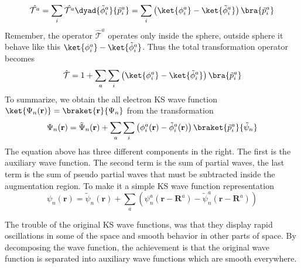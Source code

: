 \begin{equation}
\hat{\mathcal{T}^a} = \sum_i \hat{\mathcal{T}^a} \dyad{\tilde{\phi}_i^a}{\tilde{p}_i^a} = \sum_i \left( \ket{\phi_i^a} -\ket{\tilde{\phi}_i^a} \right) \bra{\tilde{p}_i^a}
\end{equation}
Remember, the operator $\hat{\mathcal{T}}^a$ operates only inside the sphere, outside sphere it behave like this $\ket{\phi_i^a} - \ket{\tilde{\phi}_i^a}$. Thus the total transformation operator becomes
\begin{equation}
\hat{\mathcal{T}} = 1 + \sum_a\sum_i\left( \ket{\phi_i^a} -\ket{\tilde{\phi}_i^a} \right) \bra{\tilde{p}_i^a} 
\end{equation}
To summarize, we obtain the all electron KS wave function $\ket{\Psi_n(\mathbf{r})} = \braket{\mathbf{r}}{\Psi_n}$ from the transformation
\begin{equation}
\label{eq_main_paw}
\Psi_n(\mathbf{r}) = \tilde{\Psi}_n(\mathbf{r}) + \sum_a\sum_i \left (\phi_i^a(\mathbf{r}) - \tilde{\phi}_i^a(\mathbf{r})   \right) \braket{\tilde{p}_i^a}{\tilde{\psi}_n}
\end{equation}
The equation above has three different components in the right. The first is the auxiliary wave function. The second term is the sum of partial waves, the last term is the sum of pseudo partial waves that must be subtracted inside the augmentation region. To make it a simple KS wave function representation
\begin{equation}
\psi_n(\mathbf{r}) = \tilde{\psi}_n(\mathbf{r}) + \sum_a\left( \psi_n^a(\mathbf{r}-\mathbf{R}^a) - \tilde{\psi}_n^a (\mathbf{r} - \mathbf{R}^a) \right)
\end{equation}

The trouble of the original KS wave functions, was that they display rapid oscillations in some of the space and smooth behavior in other parts of space. By decomposing the wave function, the achievement is that the original wave function is separated into auxiliary wave functions which are smooth everywhere.



